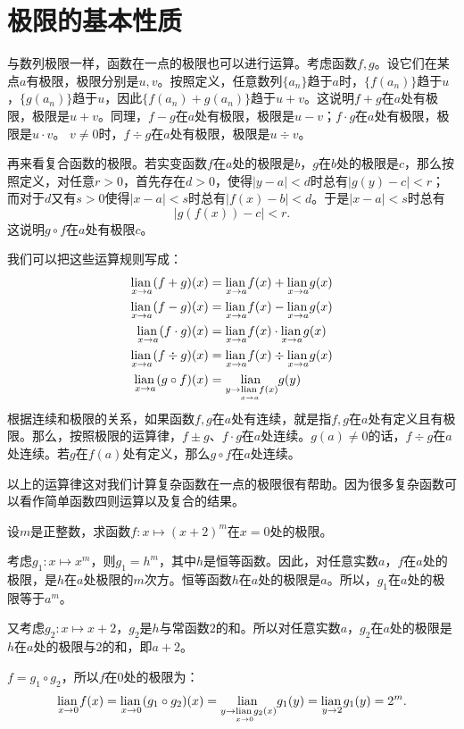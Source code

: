\documentclass[12pt,UTF8]{ctexbook}
\begin{document}
\section{极限的基本性质}
与数列极限一样，函数在一点的极限也可以进行运算。考虑函数$f,g$。设它们在某点$a$有极限，极限分别是$u, v$。按照定义，任意数列$\{a_n\}$趋于$a$时，$\{f(a_n)\}$趋于$u$，$\{g(a_n)\}$趋于$u$，因此$\{f(a_n) + g(a_n)\}$趋于$u + v$。这说明$f + g$在$a$处有极限，极限是$u + v$。同理，$f - g$在$a$处有极限，极限是$u - v$；$f \cdot g$在$a$处有极限，极限是$u \cdot v$。
$v\neq 0$时，$f\div g$在$a$处有极限，极限是$u \div v$。

再来看复合函数的极限。若实变函数$f$在$a$处的极限是$b$，$g$在$b$处的极限是$c$，那么按照定义，对任意$r>0$，首先存在$d>0$，使得$|y - a|<d$时总有$|g(y) - c| < r$；而对于$d$又有$s>0$使得$|x - a|<s$时总有$|f(x) - b| < d$。于是$|x - a|<s$时总有
$$|g(f(x)) - c| < r.$$
这说明$g\circ f$在$a$处有极限$c$。

我们可以把这些运算规则写成：
\begin{align*}
    \underset{x \to a}{\operatorname{lian}\,} (f + g)(x) &= \underset{x \to a}{\operatorname{lian}\,} f(x) + \underset{x \to a}{\operatorname{lian}\,} g(x)  \\
    \underset{x \to a}{\operatorname{lian}\,} (f - g)(x) &= \underset{x \to a}{\operatorname{lian}\,} f(x) - \underset{x \to a}{\operatorname{lian}\,} g(x)  \\
    \underset{x \to a}{\operatorname{lian}\,} (f \cdot g)(x) &= \underset{x \to a}{\operatorname{lian}\,} f(x) \cdot \underset{x \to a}{\operatorname{lian}\,} g(x)  \\
    \underset{x \to a}{\operatorname{lian}\,} (f \div g)(x) &= \underset{x \to a}{\operatorname{lian}\,} f(x) \div \underset{x \to a}{\operatorname{lian}\,} g(x)\\
    \underset{x\to a}{\operatorname{lian}\,} (g\circ f)(x) &=  \underset{y \to \underset{x \to a}{\operatorname{lian}\,} f(x)}{\operatorname{lian}\,} g(y)
\end{align*}
根据连续和极限的关系，如果函数$f,g$在$a$处有连续，就是指$f,g$在$a$处有定义且有极限。那么，按照极限的运算律，$f\pm g$、$f\cdot g$在$a$处连续。$g(a)\neq 0$的话，$f\div g$在$a$处连续。若$g$在$f(a)$处有定义，那么$g\circ f$在$a$处连续。

以上的运算律这对我们计算复杂函数在一点的极限很有帮助。因为很多复杂函数可以看作简单函数四则运算以及复合的结果。
\begin{et}
    设$m$是正整数，求函数$f:x\mapsto (x+2)^m$在$x=0$处的极限。
\end{et}
\begin{so}
    考虑$g_1: x\mapsto x^m$，则$g_1 = h^m$，其中$h$是恒等函数。因此，对任意实数$a$，$f$在$a$处的极限，是$h$在$a$处极限的$m$次方。恒等函数$h$在$a$处的极限是$a$。所以，$g_1$在$a$处的极限等于$a^m$。

    又考虑$g_2: x\mapsto x + 2$，$g_2$是$h$与常函数$2$的和。所以对任意实数$a$，$g_2$在$a$处的极限是$h$在$a$处的极限与$2$的和，即$a+2$。
    
    $f = g_1\circ g_2$，所以$f$在$0$处的极限为：
    $$ \underset{x\to 0}{\operatorname{lian}\,} f(x) = \underset{x\to 0}{\operatorname{lian}\,} (g_1\circ g_2)(x) = \underset{y \to \underset{x \to 0}{\operatorname{lian}\,} g_2(x)}{\operatorname{lian}\,} g_1(y) =  \underset{y \to 2}{\operatorname{lian}\,} g_1(y) = 2^m. $$

\end{so}
\end{document}

